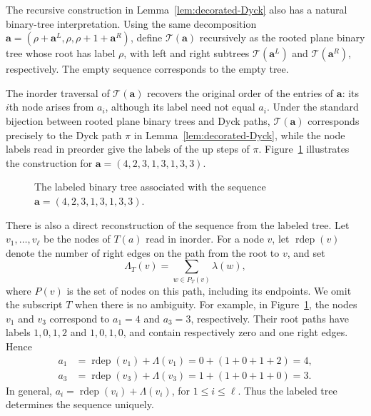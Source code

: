 \documentclass[12pt]{amsart}
\theoremstyle{plain}
\theoremstyle{definition}
\begin{document}
The recursive construction in Lemma~\ref{lem:decorated-Dyck} also has a
natural binary-tree interpretation. Using the same decomposition
$\mathbf a=(\rho+\mathbf a^L,\rho,\rho+1+\mathbf a^R)$, define
$\mathcal T(\mathbf a)$ recursively as the rooted plane binary tree whose
root has label $\rho$, with left and right subtrees
$\mathcal T(\mathbf a^L)$ and $\mathcal T(\mathbf a^R)$, respectively.
The empty sequence corresponds to the empty tree.


The inorder traversal of $\mathcal T(\mathbf a)$ recovers the original
order of the entries of $\mathbf a$: its $i$th node arises from $a_i$,
although its label need not equal $a_i$. Under the standard bijection
between rooted plane binary trees and Dyck paths, $\mathcal T(\mathbf a)$
corresponds precisely to the Dyck path $\pi$ in
Lemma~\ref{lem:decorated-Dyck}, while the node labels read in preorder
give the labels of the up steps of $\pi$. Figure~\ref{fig:tree}
illustrates the construction for
$\mathbf a=(4,2,3,1,3,1,3,3)$.

\begin{figure}[ht!]
\centering
{}
\caption{The labeled binary tree associated with the sequence
$\mathbf a=(4,2,3,1,3,1,3,3)$.}
\label{fig:tree}
\end{figure}

There is also a direct reconstruction of the sequence from the labeled tree. Let $v_1,\ldots,v_\ell$ be the nodes of $T(a)$ read in inorder.
For a node $v$, let $\operatorname{rdep}(v)$ denote the number of right
edges on the path from the root to $v$, and set
\[
\Lambda_T(v)=\sum_{w\in P_T(v)}\lambda(w),
\]
where $P(v)$ is the set of nodes on this path, including its endpoints.  We omit the subscript $T$ when there is no ambiguity. For example, in Figure~\ref{fig:tree}, the nodes $v_1$ and $v_3$
correspond to $a_1=4$ and $a_3=3$, respectively. Their root paths have
labels $1,0,1,2$ and $1,0,1,0$, and contain respectively zero and one
right edges. Hence
\[
\begin{aligned}
a_1&=\operatorname{rdep}(v_1)+\Lambda(v_1)
    =0+(1+0+1+2)=4,\\
a_3&=\operatorname{rdep}(v_3)+\Lambda(v_3)
    =1+(1+0+1+0)=3.
\end{aligned}
\]
In general, $a_i=\operatorname{rdep}(v_i)+\Lambda(v_i)$, for $1\leq i\leq\ell$. Thus the labeled tree determines the sequence uniquely.
\end{document}
